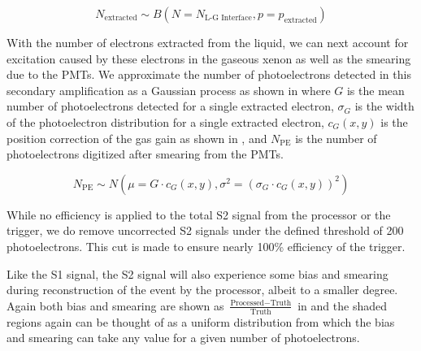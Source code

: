\begin{equation}
        \label{eqn:xe1t_binomial_ee}
        N_{\textrm{extracted}} \sim B \left( N= N_{\textrm{L-G Interface}}, p=p_{\textrm{extracted}} \right)
\end{equation}


With the number of electrons extracted from the liquid, we can next account for excitation caused by these electrons in the gaseous xenon as well as the smearing due to the PMTs.  We approximate the number of photoelectrons detected in this secondary amplification as a Gaussian process as shown in  where $G$ is the mean number of photoelectrons detected for a single extracted electron, $\sigma_G$ is the width of the photoelectron distribution for a single extracted electron, $c_{G}(x, y)$ is the position correction of the gas gain as shown in , and $N_{\textrm{PE}}$ is the number of photoelectrons digitized after smearing from the PMTs.

\begin{equation}
        \label{eqn:xe1t_gas_gain}
        N_{\textrm{PE}} \sim N(\mu=G \cdot c_{G}(x, y), \sigma^2=(\sigma_G \cdot c_{G}(x, y))^2)
\end{equation}


While no efficiency is applied to the total S2 signal from the processor or the trigger, we do remove uncorrected S2 signals under the defined threshold of 200 photoelectrons.  This cut is made to ensure nearly 100\% efficiency of the trigger.



Like the S1 signal, the S2 signal will also experience some bias and smearing during reconstruction of the event by the processor, albeit to a smaller degree.  Again both bias and smearing are shown as $\frac{\textrm{Processed} - \textrm{Truth}}{\textrm{Truth}}$ in  and the shaded regions again can be thought of as a uniform distribution from which the bias and smearing can take any value for a given number of photoelectrons.  

